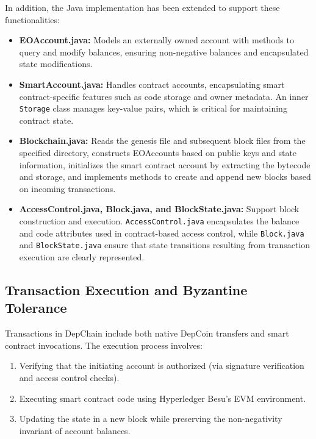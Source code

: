 \documentclass[runningheads]{llncs}
\begin{document}
In addition, the Java implementation has been extended to support these
functionalities:
\begin{itemize}
    \item \textbf{EOAccount.java:} Models an externally owned account with
    methods to query and modify balances, ensuring non-negative balances and
    encapsulated state modifications.
    \item \textbf{SmartAccount.java:} Handles contract accounts, encapsulating
    smart contract-specific features such as code storage and owner metadata. An
    inner \verb|Storage| class manages key-value pairs, which is critical for
    maintaining contract state.
    \item \textbf{Blockchain.java:} Reads the genesis file and subsequent block
    files from the specified directory, constructs EOAccounts based on public
    keys and state information, initializes the smart contract account by
    extracting the bytecode and storage, and implements methods to create and
    append new blocks based on incoming transactions.
    \item \textbf{AccessControl.java, Block.java, and BlockState.java:} Support
    block construction and execution. \verb|AccessControl.java| encapsulates the
    balance and code attributes used in contract-based access control, while
    \verb|Block.java| and \verb|BlockState.java| ensure that state transitions
    resulting from transaction execution are clearly represented.
\end{itemize}

\subsection{Transaction Execution and Byzantine Tolerance}
Transactions in DepChain include both native DepCoin transfers and smart
contract invocations. The execution process involves:
\begin{enumerate}
    \item Verifying that the initiating account is authorized (via signature
    verification and access control checks).
    \item Executing smart contract code using Hyperledger Besu's EVM
    environment.
    \item Updating the state in a new block while preserving the non-negativity
    invariant of account balances.
\end{enumerate}
\end{document}
